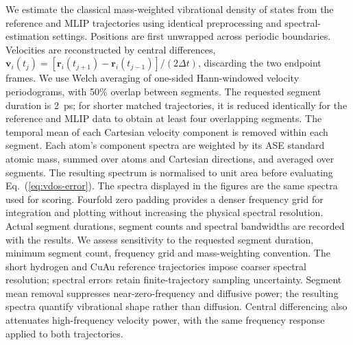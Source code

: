 We estimate the classical mass-weighted vibrational density of states from
the reference and MLIP trajectories using identical preprocessing and
spectral-estimation settings. Positions are first unwrapped across periodic
boundaries. Velocities are reconstructed by central differences,
$\mathbf{v}_i(t_j)=[\mathbf{r}_i(t_{j+1})-\mathbf{r}_i(t_{j-1})]/(2\Delta t)$,
discarding the two endpoint frames. We use Welch averaging of one-sided
Hann-windowed velocity periodograms, with 50\% overlap between segments.
The requested segment duration is 2~ps; for shorter matched trajectories,
it is reduced identically for the reference and MLIP data to obtain at
least four overlapping segments. The temporal mean of each Cartesian
velocity component is removed within each segment. Each atom's component
spectra are weighted by its ASE standard atomic mass, summed over atoms and Cartesian
directions, and averaged over segments. The resulting spectrum is
normalised to unit area before evaluating Eq.~(\ref{eq:vdos-error}).
The spectra displayed in the figures are the same spectra used for scoring.
Fourfold zero padding provides a denser frequency grid for integration and
plotting without increasing the physical spectral resolution. Actual
segment durations, segment counts and spectral bandwidths are recorded
with the results. We assess sensitivity to the requested segment duration,
minimum segment count, frequency grid and mass-weighting convention.
The short hydrogen and CuAu reference trajectories impose coarser spectral
resolution; spectral errors retain finite-trajectory sampling uncertainty.
Segment mean removal suppresses near-zero-frequency and diffusive power;
the resulting spectra quantify vibrational shape rather than diffusion.
Central differencing also attenuates high-frequency velocity power, with
the same frequency response applied to both trajectories.
